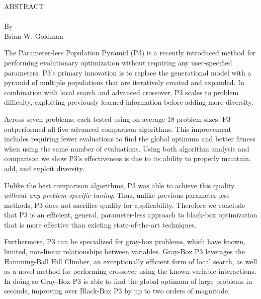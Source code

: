 \thispagestyle{empty} \setcounter{page}{2}
\begin{doublespace}
\begin{centering}
ABSTRACT\\ %
\MyTitle\\ %
By \\ %
Brian W. Goldman\\ %
\end{centering}

The Parameter-less Population Pyramid (P3) is a recently introduced method for performing
evolutionary optimization without requiring any user-specified parameters.
P3's primary innovation is to replace the generational model with a pyramid of
multiple populations that are iteratively created and expanded. In combination
with local search and advanced crossover,
P3 scales to problem difficulty, exploiting
previously learned information before adding more diversity.

Across seven problems, each tested using on average 18 problem sizes, P3 outperformed
all five advanced comparison algorithms. This improvement includes requiring fewer evaluations
to find the global optimum and better fitness when using
the same number of evaluations. Using both algorithm analysis and comparison we show P3's
effectiveness is due to its ability to properly maintain, add, and exploit diversity.

Unlike the best comparison algorithms, P3 was able to achieve this quality
\textit{without any
problem-specific tuning}. Thus, unlike previous parameter-less methods, P3 does not
sacrifice quality for applicability. Therefore we conclude that
P3 is an efficient, general, parameter-less approach to black-box
optimization that is more effective than existing state-of-the-art techniques.

Furthermore, P3 can be specialized for gray-box problems, which have
known, limited, non-linear relationships
between variables.
Gray-Box P3 leverages the Hamming-Ball Hill Climber, an exceptionally efficient
form of local search, as well as a novel method for performing crossover using the
known variable interactions. In doing so Gray-Box P3 is able to find the global
optimum of large problems in seconds, improving over Black-Box P3 by up to
two orders of magnitude.
\end{doublespace}
\newpage
